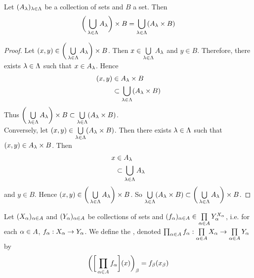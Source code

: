 \documentclass{book}
\begin{document}
	\begin{ex} 
		Let $(A_{\lambda})_{\lambda \in \Lambda}$ be a collection of sets and $B$ a set. Then 
		$$\bigg( \bigcup\limits_{\lambda \in \Lambda} A_{\lambda} \bigg) \times B = \bigcup\limits_{\lambda \in \Lambda} (A_{\lambda} \times B)$$
	\end{ex}

	\begin{proof}
		Let $(x,y) \in \bigg( \bigcup\limits_{\lambda \in \Lambda} A_{\lambda} \bigg) \times B$. Then $x \in \bigcup\limits_{\lambda \in \Lambda} A_{\lambda}$ and $y \in B$. Therefore, there exists $\lambda \in \Lambda$ such that $x \in A_{\lambda}$. Hence 
		\begin{align*}
			(x,y) 
			& \in A_{\lambda} \times B \\
			& \subset \bigcup\limits_{\lambda \in \Lambda} (A_{\lambda} \times B)
		\end{align*}
		Thus $\bigg( \bigcup\limits_{\lambda \in \Lambda} A_{\lambda} \bigg) \times B \subset  \bigcup\limits_{\lambda \in \Lambda} (A_{\lambda} \times B)$. \\
		Conversely, let $(x,y) \in \bigcup\limits_{\lambda \in \Lambda} (A_{\lambda} \times B)$. Then there exists $\lambda \in \Lambda$ such that $(x,y) \in A_{\lambda} \times B$. Then 
		\begin{align*}
			x 
			& \in A_{\lambda} \\
			& \subset \bigcup_{\lambda \in \Lambda} A_{\lambda}
		\end{align*}
		and $y \in B$. Hence $(x,y) \in \bigg( \bigcup\limits_{\lambda \in \Lambda} A_{\lambda} \bigg) \times B$. So $ \bigcup\limits_{\lambda \in \Lambda} (A_{\lambda} \times B) \subset \bigg( \bigcup\limits_{\lambda \in \Lambda} A_{\lambda} \bigg) \times B$.
	\end{proof}

	\begin{defn}   
		Let $(X_{\alpha})_{\alpha \in A}$ and $(Y_{\alpha})_{\alpha \in A}$ be collections of sets and $(f_{\alpha})_{\alpha \in A} \in \prod\limits_{\alpha \in A} Y_{\alpha}^{X_{\alpha}}$, i.e. for each $\alpha \in A$, $f_{\alpha}:X_{\alpha} \rightarrow Y_{\alpha}$. We define the , denoted $\prod_{\alpha \in A} f_{\alpha}: \prod\limits_{\alpha \in A} X_{\alpha} \rightarrow  \prod\limits_{\alpha \in A} Y_{\alpha}$ by 
		$$\bigg( \bigg[\prod_{\alpha \in A} f_{\alpha} \bigg] (x) \bigg)_{\beta} = f_{\beta}(x_{\beta})$$
	\end{defn}
	
\end{document}
